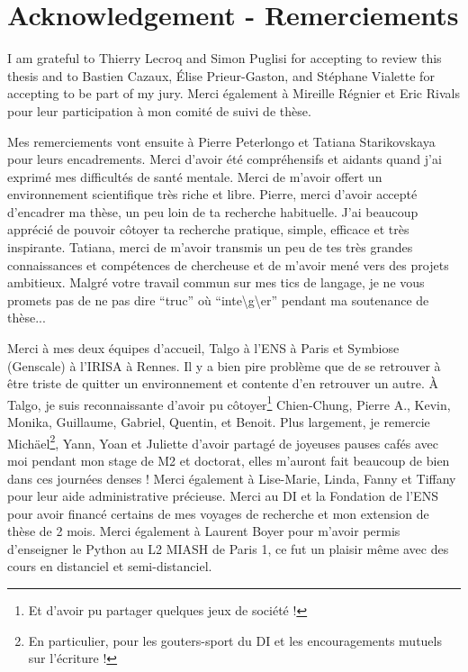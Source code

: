 \chapter*{Acknowledgement - Remerciements}
\thispagestyle{empty}

I am grateful to Thierry Lecroq and Simon Puglisi for accepting to review this thesis and to Bastien Cazaux, Élise Prieur-Gaston, and Stéphane Vialette for accepting to be part of my jury. Merci également à Mireille Régnier et Eric Rivals pour leur participation à mon comité de suivi de thèse.


Mes remerciements vont ensuite à Pierre Peterlongo et Tatiana Starikovskaya pour leurs encadrements. Merci d’avoir été compréhensifs et aidants quand j’ai exprimé mes difficultés de santé mentale. Merci de m’avoir offert un environnement scientifique très riche et libre.
Pierre, merci d’avoir accepté d’encadrer ma thèse, un peu loin de ta recherche habituelle. J’ai beaucoup apprécié de pouvoir côtoyer ta recherche pratique, simple, efficace et très inspirante.
Tatiana, merci de m’avoir transmis un peu de tes très grandes connaissances et compétences de chercheuse et de m’avoir mené vers des projets ambitieux.
Malgré votre travail commun sur mes tics de langage, je ne vous promets pas de ne pas dire ``truc'' où ``inte\textbackslash g\textbackslash er'' pendant ma soutenance de thèse...


Merci à mes deux équipes d’accueil, Talgo à l’ENS à Paris et Symbiose (Genscale) à l’IRISA à Rennes. Il y a bien pire problème que de se retrouver à être triste de quitter un environnement et contente d’en retrouver un autre.
À Talgo, je suis reconnaissante d’avoir pu côtoyer\footnote{Et d'avoir pu partager quelques jeux de société !} Chien-Chung, Pierre A., Kevin, Monika, Guillaume, Gabriel, Quentin, et Benoit.
Plus largement, je remercie Michäel\footnote{En particulier, pour les gouters-sport du DI et les encouragements mutuels sur l'écriture !}, Yann, Yoan et Juliette d’avoir partagé de joyeuses pauses cafés avec moi pendant mon stage de M2 et doctorat, elles m’auront fait beaucoup de bien dans ces journées denses !
Merci également à Lise-Marie, Linda, Fanny et Tiffany pour leur aide administrative précieuse. Merci au DI et la Fondation de l’ENS pour avoir financé certains de mes voyages de recherche et mon extension de thèse de 2 mois.
Merci également à Laurent Boyer pour m’avoir permis d’enseigner le Python au L2 MIASH de Paris 1, ce fut un plaisir même avec des cours en distanciel et semi-distanciel.


